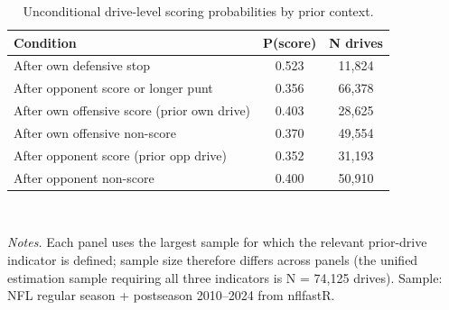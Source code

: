 \begin{table}[htbp]
\centering
\caption{Unconditional drive-level scoring probabilities by prior context.}
\label{tab:descrip}
\begin{tabular}{lcc}
\toprule
Condition & P(score) & N drives \\
\midrule
After own defensive stop & 0.523 & 11,824 \\
After opponent score or longer punt & 0.356 & 66,378 \\
\midrule
After own offensive score (prior own drive) & 0.403 & 28,625 \\
After own offensive non-score & 0.370 & 49,554 \\
\midrule
After opponent score (prior opp drive) & 0.352 & 31,193 \\
After opponent non-score & 0.400 & 50,910 \\
\bottomrule
\end{tabular}
\\[0.5em]
\begin{minipage}{0.95\textwidth}
\footnotesize
\textit{Notes.} Each panel uses the largest sample for which the relevant prior-drive indicator is defined; sample size therefore differs across panels (the unified estimation sample requiring all three indicators is N = 
74{,}125
 drives). Sample: NFL regular season + postseason 2010--2024 from nflfastR. 
\end{minipage}
\end{table}
